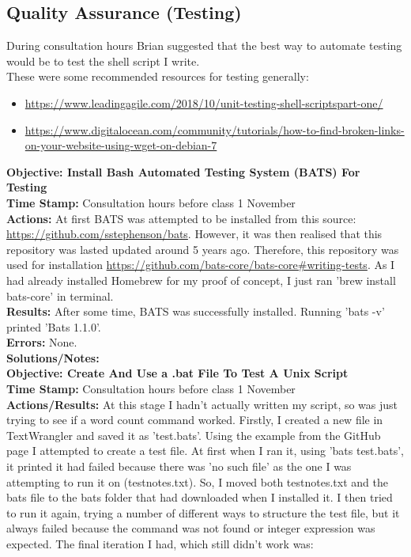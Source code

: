 \documentclass{article}
\begin{document}
\begin{FlushLeft}
\subsection{Quality Assurance (Testing)}
During consultation hours Brian suggested that the best way to automate testing would be to test the shell script I write.\\
These were some recommended resources for testing generally:
\begin{itemize}
    \item \url{https://www.leadingagile.com/2018/10/unit-testing-shell-scriptspart-one/}
    \item \url{https://www.digitalocean.com/community/tutorials/how-to-find-broken-links-on-your-website-using-wget-on-debian-7}
\end{itemize}
\vspace{5mm}
\textbf{Objective: Install Bash Automated Testing System (BATS) For Testing}\\
\textbf{Time Stamp:} Consultation hours before class 1 November\\
\textbf{Actions:} At first BATS was attempted to be installed from this source: \url{https://github.com/sstephenson/bats}. However, it was then realised that this repository was lasted updated around 5 years ago. Therefore, this repository was used for installation \url{https://github.com/bats-core/bats-core#writing-tests}. As I had already installed Homebrew for my proof of concept, I just ran 'brew install bats-core' in terminal.\\
\textbf{Results:} After some time, BATS was successfully installed. Running 'bats -v' printed 'Bats 1.1.0'.\\
\textbf{Errors:} None.\\
\textbf{Solutions/Notes:}\\
\vspace{5mm}
\textbf{Objective: Create And Use a .bat File To Test A Unix Script}\\
\textbf{Time Stamp:} Consultation hours before class 1 November\\
\textbf{Actions/Results:} At this stage I hadn't actually written my script, so was just trying to see if a word count command worked. Firstly, I created a new file in TextWrangler and saved it as 'test.bats'. Using the example from the GitHub page I attempted to create a test file. At first when I ran it, using 'bats test.bats', it printed it had failed because there was 'no such file' as the one I was attempting to run it on (test\textunderscore notes.txt). So, I moved both test\textunderscore notes.txt and the bats file to the bats folder that had downloaded when I installed it. I then tried to run it again, trying a number of different ways to structure the test file, but it always failed because the command was not found or integer expression was expected. The final iteration I had, which still didn't work was:

\end{FlushLeft}
\end{document}
